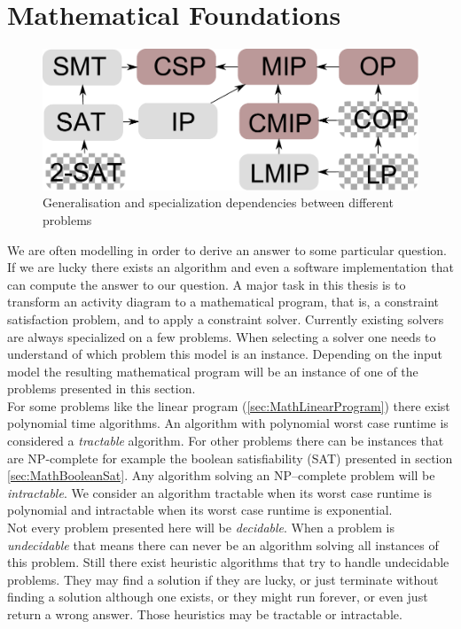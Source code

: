 \section{Mathematical Foundations}
\label{sec:Maths}
\begin{figure}
\label{fig:problemLatice}
\includegraphics[width=\textwidth]{./pics/ProblemLatice.pdf}
\caption{Generalisation and specialization dependencies between different problems}
\end{figure}
We are often modelling in order to derive an answer to some particular question. If we are lucky there exists an algorithm and even a software implementation that can compute the answer to our question. A major task in this thesis is to transform an activity diagram to a mathematical program, that is, a constraint satisfaction problem, and to apply a constraint solver. Currently existing solvers are always specialized on a few problems. When selecting a solver one needs to understand of which problem this model is an instance. Depending on the input model the resulting mathematical program will be an instance of one of the problems presented in this section.\\
For some problems like the linear program (\ref{sec:MathLinearProgram}) there exist polynomial time algorithms. An algorithm with polynomial worst case runtime is considered a \emph{tractable} algorithm. For other problems there can be instances that are NP-complete for example the boolean satisfiability (SAT) presented in section \ref{sec:MathBooleanSat}. Any algorithm solving an NP--complete problem will be \emph{intractable}. We consider an algorithm tractable when its worst case runtime is polynomial and intractable when its worst case runtime is exponential.\\
Not every problem presented here will be \emph{decidable}. When a problem is \emph{undecidable} that means there can never be an algorithm solving all instances of this problem. Still there exist heuristic algorithms that try to handle undecidable problems. They may find a solution if they are lucky, or just terminate without finding a solution although one exists, or they might run forever, or even just return a wrong answer. Those heuristics may be tractable or intractable.\\
